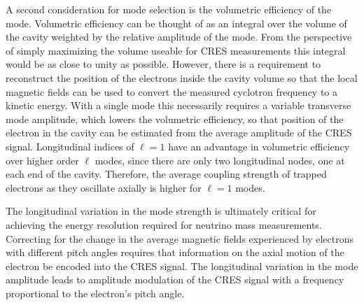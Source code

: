 A second consideration for mode selection is the volumetric efficiency of the mode. Volumetric efficiency can be thought of as an integral over the volume of the cavity weighted by the relative amplitude of the mode. From the perspective of simply maximizing the volume useable for CRES measurements this integral would be as close to unity as possible. However, there is a requirement to reconstruct the position of the electrons inside the cavity volume so that the local magnetic fields can be used to convert the measured cyclotron frequency to a kinetic energy. With a single mode this necessarily requires a variable transverse mode amplitude, which lowers the volumetric efficiency, so that position of the electron in the cavity can be estimated from the average amplitude of the CRES signal. Longitudinal indices of $\ell=1$ have an advantage in volumetric efficiency over higher order $\ell$ modes, since there are only two longitudinal nodes, one at each end of the cavity. Therefore, the average coupling strength of trapped electrons as they oscillate axially is higher for $\ell=1$ modes.

The longitudinal variation in the mode strength is ultimately critical for achieving the energy resolution required for neutrino mass measurements. Correcting for the change in the average magnetic fields experienced by electrons with different pitch angles requires that information on the axial motion of the electron be encoded into the CRES signal. The longitudinal variation in the mode amplitude leads to amplitude modulation of the CRES signal with a frequency proportional to the electron's pitch angle. 

